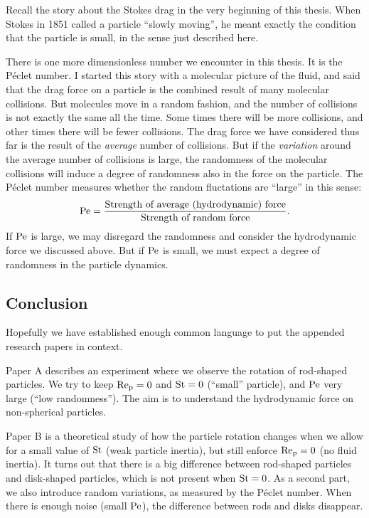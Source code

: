 \documentclass[thesis.tex]{subfiles}
\begin{document}
Recall the story about the Stokes drag in the very beginning of this thesis. When Stokes in 1851 called a particle ``slowly moving'', he meant exactly the condition that the particle is small, in the sense just described here.

There is one more dimensionless number we encounter in this thesis. It is the P\'eclet number. I started this story with a molecular picture of the fluid, and said that the drag force on a particle is the combined result of many molecular collisions. But molecules move in a random fashion, and the number of collisions is not exactly the same all the time. Some times there will be more collisions, and other times there will be fewer collisions. The drag force we have considered thus far is the result of the \emph{average} number of collisions. But if the \emph{variation} around the average number of collisions is large, the randomness of the molecular collisions will induce a degree of randomness also in the force on the particle. The P\'eclet number measures whether the random fluctations are ``large'' in this sense:
\begin{align*}
    \mbox{Pe} = \frac{\textrm{Strength of average (hydrodynamic) force}}{\textrm{Strength of random force}}.
\end{align*}
If $\mbox{Pe}$ is large, we may disregard the randomness and consider the hydrodynamic force we discussed above. But if $\mbox{Pe}$ is small, we must expect a degree of randomness in the particle dynamics.

\subsection*{Conclusion}

Hopefully we have established enough common language to put the appended research papers in context.

Paper A describes an experiment where we observe the rotation of rod-shaped particles. We try to keep $\mbox{Re}_{\mathrm p}=0$ and $\mbox{St}=0$ (``small'' particle), and $\mbox{Pe}$ very large (``low randomness''). The aim is to understand the hydrodynamic force on non-spherical particles.

Paper B is a theoretical study of how the particle rotation changes when we allow for a small value of $\mbox{St}$ (weak particle inertia), but still enforce $\mbox{Re}_{\mathrm p}=0$ (no fluid inertia). It turns out that there is a big difference between rod-shaped particles and disk-shaped particles, which is not present when $\mbox{St}=0$. As a second part, we also introduce random variations, as measured by the P\'eclet number. When there is enough noise (small $\mbox{Pe}$), the difference between rods and disks disappear.
\end{document}
